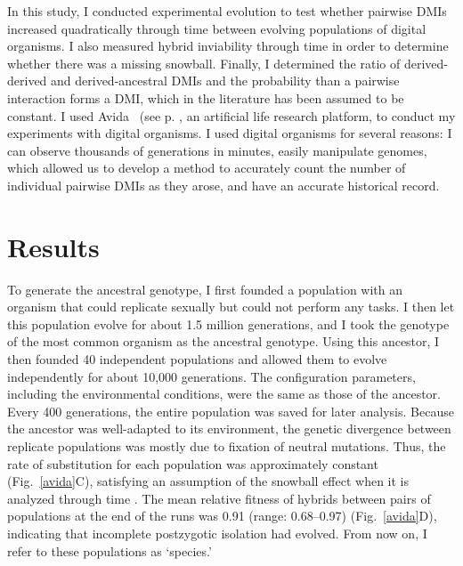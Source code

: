 \begin{doublespace}


In this study, I conducted experimental evolution
to test whether pairwise DMIs increased quadratically through time
between evolving populations of digital organisms.
%
I also measured hybrid inviability through time
in order to determine whether there was a missing snowball.
%
Finally, I determined the ratio of derived-derived and derived-ancestral DMIs
and the probability than a pairwise interaction forms a DMI,
which in the literature has been assumed to be constant.
%
I used Avida~\citep{ofr04} (see p. \pageref{sec:avida},
an artificial life research platform,
to conduct my experiments with digital organisms.
%
I used digital organisms for several reasons:
I can observe thousands of generations in minutes,
easily manipulate genomes, which allowed us to
develop a method to accurately count the number of individual pairwise DMIs
as they arose,
and have an accurate historical record.







\section{Results}

To generate the ancestral genotype, I first founded a population
with an organism that could replicate sexually but could not perform any tasks.
%
I then let this population evolve for about 1.5 million generations,
and I took the genotype of the most common organism as the ancestral genotype.
%
Using this ancestor, I then founded 40 independent populations
and allowed them to evolve independently for about 10,000 generations.
%
The configuration parameters, including the environmental conditions,
were the same as those of the ancestor.
%
Every 400 generations, the entire population was saved for later analysis.
%
Because the ancestor was well-adapted to its environment,
the genetic divergence between replicate populations
was mostly due to fixation of neutral mutations.
%
Thus, the rate of substitution for each population
was approximately constant (Fig.~\ref{avida}C),
satisfying an assumption of the snowball effect
when it is analyzed through time \citep{orr95}.
%
The mean relative fitness of hybrids between pairs of populations
at the end of the runs was 0.91 (range: 0.68--0.97) (Fig.~\ref{avida}D),
indicating that incomplete postzygotic isolation had evolved.
%
From now on, I refer to these populations as `species.'




\end{doublespace}
